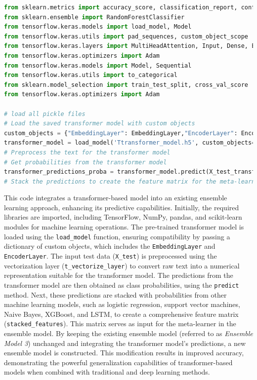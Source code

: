 \begin{tcolorbox}[colback=gray!5!white, colframe=gray!80!black, boxrule=0.5pt, title=Ensemble Model 7]
    \begin{lstlisting}[language=Python]
from sklearn.metrics import accuracy_score, classification_report, confusion_matrix
from sklearn.ensemble import RandomForestClassifier
from tensorflow.keras.models import load_model, Model
from tensorflow.keras.utils import pad_sequences, custom_object_scope
from tensorflow.keras.layers import MultiHeadAttention, Input, Dense, Embedding, GlobalAveragePooling1D, LayerNormalization, Layer
from tensorflow.keras.optimizers import Adam
from tensorflow.keras.models import Model, Sequential
from tensorflow.keras.utils import to_categorical
from sklearn.model_selection import train_test_split, cross_val_score
from tensorflow.keras.optimizers import Adam

# load all pickle files
# Load the saved transformer model with custom objects
custom_objects = {"EmbeddingLayer": EmbeddingLayer,"EncoderLayer": EncoderLayer}
transformer_model = load_model('Ttransformer_model.h5', custom_objects=custom_objects)
# Preprocess the text for the transformer model
# Get probabilities from the transformer model
transformer_predictions_proba = transformer_model.predict(X_test_transformer)
# Stack the predictions to create the feature matrix for the meta-learner
    \end{lstlisting}
\end{tcolorbox}

\noindent
This code integrates a transformer-based model into an existing ensemble learning approach, enhancing its predictive capabilities. Initially, the required libraries are imported, including TensorFlow, NumPy, pandas, and scikit-learn modules for machine learning operations. The pre-trained transformer model is loaded using the \texttt{load\_model} function, ensuring compatibility by passing a dictionary of custom objects, which includes the \texttt{EmbeddingLayer} and \texttt{EncoderLayer}. The input test data (\texttt{X\_test}) is preprocessed using the vectorization layer (\texttt{t\_vectorize\_layer}) to convert raw text into a numerical representation suitable for the transformer model. The predictions from the transformer model are then obtained as class probabilities, using the \texttt{predict} method. Next, these predictions are stacked with probabilities from other machine learning models, such as logistic regression, support vector machines, Naive Bayes, XGBoost, and LSTM, to create a comprehensive feature matrix (\texttt{stacked\_features}). This matrix serves as input for the meta-learner in the ensemble model. By keeping the existing ensemble model (referred to as \textit{Ensemble Model 3}) unchanged and integrating the transformer model's predictions, a new ensemble model is constructed. This modification results in improved accuracy, demonstrating the powerful generalization capabilities of transformer-based models when combined with traditional and deep learning methods.

